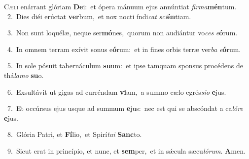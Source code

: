 \lettrine{\initial\textcolor{\initialcolor}{C}}{æli} enárrant glóriam \textbf{De}\-i:~\star et ópera mánuum ejus annúntiat \textit{fir}\-\textit{ma}\textbf{mén}tum.\\
{\numbfont\textcolor{\numbcolor}{~2.}}~Dies diéi erúctat \textbf{ver}\-bum,~\star et nox nocti índi\textit{cat} \textit{sci}\-\textbf{én}tiam.\par
{\numbfont\textcolor{\numbcolor}{~3.}}~Non sunt loquélæ, neque ser\-\textbf{mó}\-nes,~\star quorum non audiántur vo\textit{ces} \textit{e}\-\textbf{ó}rum.\par
{\numbfont\textcolor{\numbcolor}{~4.}}~In omnem terram exívit sonus e\-\textbf{ó}\-rum:~\star et in fines orbis terræ ver\textit{ba} \textit{e}\-\textbf{ó}rum.\par
{\numbfont\textcolor{\numbcolor}{~5.}}~In sole pósuit tabernáculum \textbf{su}\-um:~\star et ipse tamquam sponsus procédens de thá\-\textit{la}\-\textit{mo} \textbf{su}\-o.\par
{\numbfont\textcolor{\numbcolor}{~6.}}~Exsultávit ut gigas ad curréndam \textbf{vi}\-am,~\star a summo cælo egrés\-\textit{si}\-\textit{o} \textbf{e}\-jus.\par
{\numbfont\textcolor{\numbcolor}{~7.}}~Et occúrsus ejus usque ad summum \textbf{e}\-jus:~\star nec est qui se abscóndat a ca\-\textit{ló}\-\textit{re} \textbf{e}\-jus.\par
{\numbfont\textcolor{\numbcolor}{~8.}}~Glória Patri, et \textbf{Fí}\-lio,~\star et Spirí\-\textit{tu}\-\textit{i} \textbf{Sanc}\-to.\par
{\numbfont\textcolor{\numbcolor}{~9.}}~Sicut erat in princípio, et nunc, et \textbf{sem}\-per,~\star et in sǽcula sæcu\-\textit{ló}\-\textit{rum}. \textbf{A}\-men.\par
